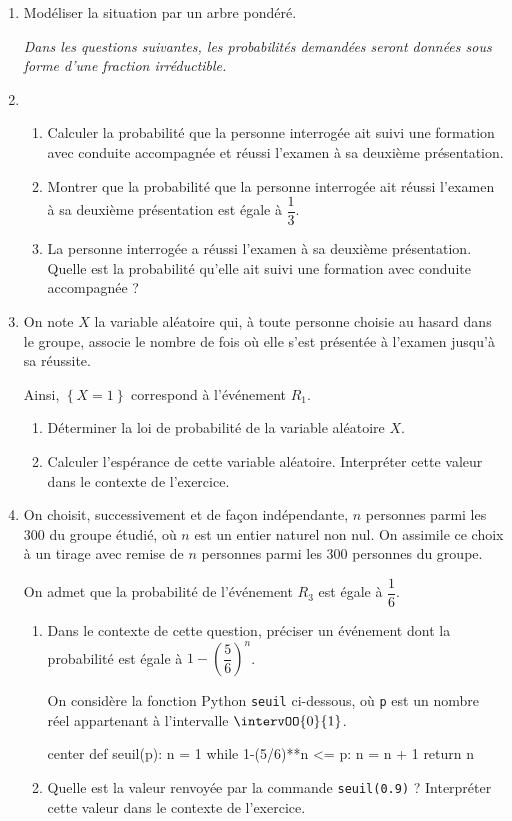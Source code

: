 \begin{enumerate}
	\item Modéliser la situation par un arbre pondéré.
	
	\textit{Dans les questions suivantes, les probabilités demandées seront données sous forme d’une fraction irréductible.}
	\item 
	\begin{enumerate}
		\item Calculer la probabilité que la personne interrogée ait suivi une formation avec conduite
		accompagnée et réussi l’examen à sa deuxième présentation.
		\item Montrer que la probabilité que la personne interrogée ait réussi l’examen à sa deuxième présentation est égale à $\dfrac13$.
		\item La personne interrogée a réussi l’examen à sa deuxième présentation. Quelle est la probabilité qu’elle ait suivi une formation avec conduite accompagnée ? 
	\end{enumerate}
	\item On note $X$ la variable aléatoire qui, à toute personne choisie au hasard dans le groupe, associe le nombre de fois où elle s’est présentée à l’examen jusqu'à sa réussite.
	
	Ainsi, $\left\lbrace X=1 \right\rbrace$ correspond à l’événement $R_1$.
	\begin{enumerate}
		\item Déterminer la loi de probabilité de la variable aléatoire $X$.
		\item Calculer l’espérance de cette variable aléatoire. Interpréter cette valeur dans le contexte de l’exercice. 
	\end{enumerate}
	\item On choisit, successivement et de façon indépendante, $n$ personnes parmi les 300 du groupe étudié, où $n$ est un entier naturel non nul. On assimile ce choix à un tirage avec remise de $n$ personnes parmi les 300 personnes du groupe.
	
	On admet que la probabilité de l’événement $R_3$ est égale à $\dfrac16$.
	\begin{enumerate}
		\item Dans le contexte de cette question, préciser un événement dont la probabilité est égale à \mbox{$1-\left(\dfrac56\right)^n$}.
		
		On considère la fonction \textsf{Python} \texttt{seuil} ci-dessous, où \texttt{p} est un nombre réel appartenant à l'intervalle $\intervOO{0}{1}$.
\begin{CodePythonLstAlt}[Largeur=6cm]{center}
def seuil(p):
	n = 1
	while 1-(5/6)**n <= p: 
		n = n + 1 
	return n 
\end{CodePythonLstAlt}
		\item Quelle est la valeur renvoyée par la commande \texttt{seuil(0.9)} ? Interpréter cette valeur dans le contexte de l’exercice.
	\end{enumerate}
\end{enumerate}

